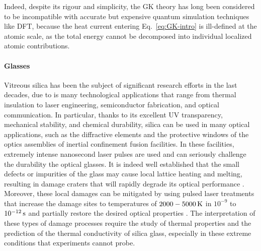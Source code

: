 Indeed, despite its rigour and simplicity, the GK theory has long been considered to be incompatible with accurate but expensive quantum simulation techniques like DFT, because the heat current entering Eq.~\eqref{eq:GK-intro} is ill-defined at the atomic scale, as the total energy cannot be decomposed into individual localized atomic contributions. 

\bigskip

\paragraph{Glasses}

Vitreous silica has been the subject of significant research efforts in the last decades, due to is many technological applications that range from thermal insulation to laser engineering, semiconductor fabrication, and optical communication.
In particular, thanks to its excellent UV transparency, mechanical stability, and chemical durability, silica can be used in many optical applications, such as the diffractive elements and the protective windows of the optics assemblies of inertial confinement fusion facilities. In these facilities, extremely intense nanosecond laser pulses are used and can seriously challenge the durability the optical glasses. It is indeed well established that the small defects or impurities of the glass may cause local lattice heating and melting, resulting in damage craters that will rapidly degrade its optical performance \cite{Miller2004,Canaud2004,Miller2010,Chambonneau2014,Kuzuu1999,Stuart1995,Wong2006,Carr2010,Saito2000}. Moreover, these local damages can be mitigated by using pulsed laser treatments that increase the damage sites to temperatures of $2000-5000\,\mathrm{K}$ in $10^{-9}$ to $10^{-12}\,\mathrm{s}$ and partially restore the desired optical properties \cite{Soules2011}. 
The interpretation of these types of damage processes require the study of thermal properties and the prediction of the thermal conductivity of silica glass, especially in these extreme conditions that experiments cannot probe.

